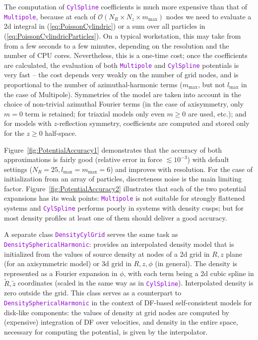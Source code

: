 \documentclass[12pt]{article}
\newcommand{\ttt}[1]{\textcolor{darkviolet}{\texttt{#1}}}
\begin{document}
The computation of \ttt{CylSpline} coefficients is much more expensive than that of \ttt{Multipole}, because at each of $\mathcal{O}(N_R\times N_z \times m_\mathrm{max})$ nodes we need to evaluate a 2d integral in (\ref{eq:PoissonCylindric}) or a sum over all particles in (\ref{eq:PoissonCylindricParticles}). On a typical workstation, this may take from from a few seconds to a few minutes, depending on the resolution and the number of CPU cores. Nevertheless, this is a one-time cost; once the coefficients are calculated, the evaluation of both \ttt{Multipole} and \ttt{CylSpline} potentials is very fast -- the cost depends very weakly on the number of grid nodes, and is proportional to the number of azimuthal-harmonic terms ($m_\mathrm{max}$, but not $l_\mathrm{max}$ in the case of Multipole).
Symmetries of the model are taken into account in the choice of non-trivial azimuthal Fourier terms (in the case of axisymmetry, only $m=0$ term is retained; for triaxial models only even $m\ge 0$ are used, etc.); and for models with $z$-reflection symmetry, coefficients are computed and stored only for the $z\ge 0$ half-space.

Figure~\ref{fig:PotentialAccuracy1} demonstrates that the accuracy of both approximations is fairly good (relative error in force $\lesssim 10^{-3}$) with default settings ($N_R=25, l_\mathrm{max}=m_\mathrm{max}=6$) and improves with resolution. For the case of initialization from an array of particles, discreteness noise is the main limiting factor.
Figure~\ref{fig:PotentialAccuracy2} illustrates that each of the two potential expansions has its weak points: \ttt{Multipole} is not suitable for strongly flattened systems and \ttt{CylSpline} performs poorly in systems with density cusps; but for most density profiles at least one of them should deliver a good accuracy.

\label{sec:DensityCylGrid} A separate class \ttt{DensityCylGrid} serves the same task as \ttt{DensitySphericalHarmonic}: provides an interpolated density model that is initialized from the values of source density at nodes of a 2d grid in $R,z$ plane (for an axisymmetric model) or 3d grid in $R,z,\phi$ (in general). The density is represented as a Fourier expansion in $\phi$, with each term being a 2d cubic spline in $\tilde R, \tilde z$ coordinates (scaled in the same way as in \ttt{CylSpline}). Interpolated density is zero outside the grid. This class serves as a counterpart to \ttt{DensitySphericalHarmonic} in the context of DF-based self-consistent models for disk-like components: the values of density at grid nodes are computed by (expensive) integration of DF over velocities, and density in the entire space, necessary for computing the potential, is given by the interpolator.
\end{document}
